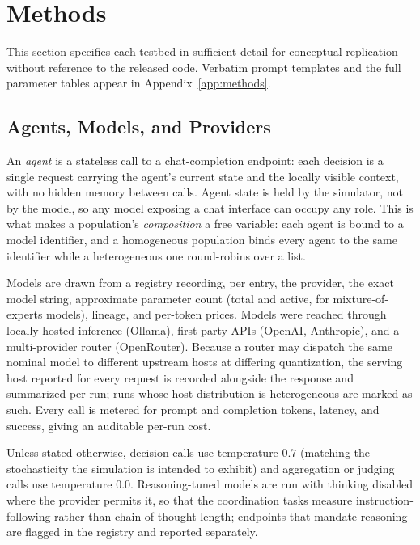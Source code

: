 \documentclass[manuscript,screen,review]{acmart}
\begin{document}
{\color{revblue}%
\section{Methods}
\label{sec:methods}
This section specifies each testbed in sufficient detail for conceptual
replication without reference to the released code. Verbatim prompt templates and
the full parameter tables appear in Appendix~\ref{app:methods}.

\subsection{Agents, Models, and Providers}
\label{sec:methods-models}
An \emph{agent} is a stateless call to a chat-completion endpoint: each decision
is a single request carrying the agent's current state and the locally visible
context, with no hidden memory between calls. Agent state is held by the
simulator, not by the model, so any model exposing a chat interface can occupy
any role. This is what makes a population's \emph{composition} a free variable:
each agent is bound to a model identifier, and a homogeneous population binds
every agent to the same identifier while a heterogeneous one round-robins over a
list.

Models are drawn from a registry recording, per entry, the provider, the exact
model string, approximate parameter count (total and active, for
mixture-of-experts models), lineage, and per-token prices. Models were reached
through locally hosted inference (Ollama), first-party APIs (OpenAI, Anthropic),
and a multi-provider router (OpenRouter). Because a router may dispatch the same
nominal model to different upstream hosts at differing quantization, the serving
host reported for every request is recorded alongside the response and
summarized per run; runs whose host distribution is heterogeneous are marked as
such. Every call is metered for prompt and completion tokens, latency, and
success, giving an auditable per-run cost.

Unless stated otherwise, decision calls use temperature $0.7$ (matching the
stochasticity the simulation is intended to exhibit) and aggregation or judging
calls use temperature $0.0$. Reasoning-tuned models are run with thinking
disabled where the provider permits it, so that the coordination tasks measure
instruction-following rather than chain-of-thought length; endpoints that
mandate reasoning are flagged in the registry and reported separately.

}
\end{document}
